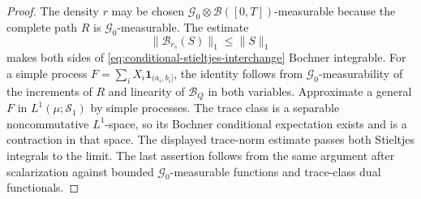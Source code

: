 \documentclass[10pt,reqno]{amsart}
\theoremstyle{plain}
\theoremstyle{definition}
\theoremstyle{remark}
\begin{document}
\begin{proof}
The density $r$ may be chosen
$\mathcal G_0\otimes\mathcal B([0,T])$-measurable because the complete path
$R$ is $\mathcal G_0$-measurable.  The estimate
\[
 \|\mathcal B_{r_s}(S)\|_1\le\|S\|_1
\]
makes both sides of \eqref{eq:conditional-stieltjes-interchange} Bochner
integrable.  For a simple process
$F=\sum_iX_i\mathbf1_{(a_i,b_i]}$, the identity follows from
$\mathcal G_0$-measurability of the increments of $R$ and linearity of
$\mathcal B_Q$ in both variables.  Approximate a general $F$ in
$L^1(\mu;\mathcal S_1)$ by simple processes.  The trace class is a separable
noncommutative $L^1$-space, so its Bochner conditional expectation exists and
is a contraction in that space.  The displayed trace-norm estimate passes both
Stieltjes integrals to the limit.  The last assertion follows from the same
argument after scalarization against bounded
$\mathcal G_0$-measurable functions and trace-class dual functionals.
\end{proof}
\end{document}
